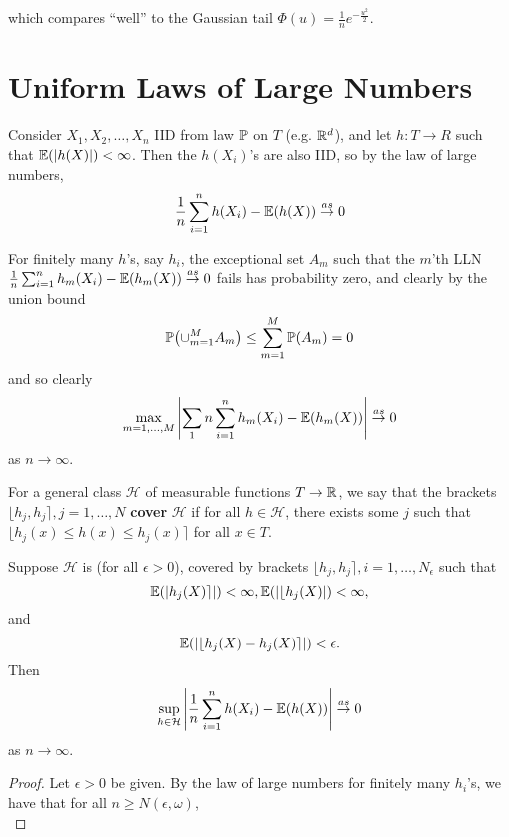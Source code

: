 which compares ``well'' to the Gaussian tail $\Phi(u) =
\frac{1}{n}e^{-\frac{u^{2}}{2}}$.


\section{Uniform Laws of Large Numbers}
\label{sec:uniform-laws-large}

Consider $X_{1}, X_{2}, \dots, X_{n}$ IID from law $\Prob$ on $T$
(e.g. $\mathbb{R}^{d}$), and let $h: T \rightarrow R$ such that $\E{|h(X)|} <
\infty$. Then the $h(X_{i})$'s are also IID, so by the law of large
numbers,
\begin{equation}
  \label{eq:23}
  \frac{1}{n} \sum_{i=1}^{n} h(X_{i}) - \E{h(X)} \cas 0
\end{equation}

For finitely many $h$'s, say $h_{i}$, the exceptional set $A_{m}$ such
that the $m$'th LLN $\frac{1}{n} \sum_{i=1}^{n} h_{m}(X_{i}) -
\E{h_{m}(X)} \cas 0$ fails has probability zero, and clearly by the
union bound
\begin{equation}
  \label{eq:24}
  \Prob{\cup_{m=1}^{M} A_{m}} \leq \sum_{m=1}^{M} \Prob{A_{m}} = 0
\end{equation} and so clearly
\begin{equation}
  \label{eq:25}
  \max_{m=1, \dots, M} \left| \sum_{1}{n} \sum_{i=1}^{n} h_{m}(X_{i})
    - \E{h_{m}(X)} \right| \cas 0
\end{equation} as $n \rightarrow \infty$.

For a general class $\mathcal{H}$ of measurable functions $T
\rightarrow \mathbb{R}$, we say that the brackets $\lfloor h_{j}, h_{j}
\rceil, j = 1, \dots, N$ \textbf{cover} $\mathcal{H}$ if for all $h
\in \mathcal{H}$, there exists some $j$ such that $\lfloor h_{j}(x)
\leq h(x) \leq h_{j}(x) \rceil$ for all $x \in T$.

\begin{proposition}
  Suppose $\mathcal{H}$ is (for all $\epsilon > 0$), covered by
  brackets $\lfloor h_{j}, h_{j} \rceil, i = 1, \dots, N_{\epsilon}$
  such that
  \begin{equation}
    \label{eq:26}
    \E{|h_{j}(X)\rceil|} < \infty, \E{|\lfloor h_{j}(X)|} < \infty,
  \end{equation} and
  \begin{equation}
    \label{eq:27}
    \E{|\lfloor h_{j}(X) - h_{j}(X)\rceil|} < \epsilon.
  \end{equation}  Then
  \begin{equation}
    \label{eq:28}
    \sup_{h \in \mathcal{H}} \left| \frac{1}{n} \sum_{i=1}^{n}
      h(X_{i}) - \E{h(X)} \right| \cas 0
  \end{equation} as $n \rightarrow \infty$.
\end{proposition}

\begin{proof}
  Let $\epsilon > 0$ be given. By the law of large numbers for
  finitely many $h_{i}$'s, we have that for all $n \geq N(\epsilon,
  \omega)$,
  \begin{equation}
    \label{eq:29}
  \end{equation}
\end{proof}

